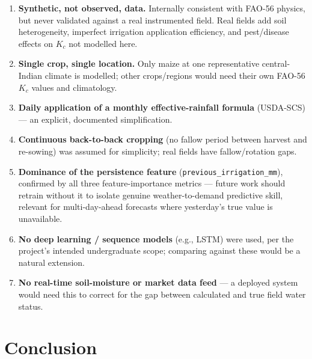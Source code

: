 \documentclass[11pt,a4paper]{article}
\begin{document}
\begin{enumerate}[label=\arabic*.,leftmargin=2em]
    \item \textbf{Synthetic, not observed, data.} Internally consistent with
    FAO-56 physics, but never validated against a real instrumented field.
    Real fields add soil heterogeneity, imperfect irrigation application
    efficiency, and pest/disease effects on $K_c$ not modelled here.
    \item \textbf{Single crop, single location.} Only maize at one
    representative central-Indian climate is modelled; other crops/regions
    would need their own FAO-56 $K_c$ values and climatology.
    \item \textbf{Daily application of a monthly effective-rainfall formula}
    (USDA-SCS) --- an explicit, documented simplification.
    \item \textbf{Continuous back-to-back cropping} (no fallow period between
    harvest and re-sowing) was assumed for simplicity; real fields have
    fallow/rotation gaps.
    \item \textbf{Dominance of the persistence feature}
    (\texttt{previous\_irrigation\_mm}), confirmed by all three
    feature-importance metrics --- future work should retrain without it to
    isolate genuine weather-to-demand predictive skill, relevant for
    multi-day-ahead forecasts where yesterday's true value is unavailable.
    \item \textbf{No deep learning / sequence models} (e.g., LSTM) were used,
    per the project's intended undergraduate scope; comparing against these
    would be a natural extension.
    \item \textbf{No real-time soil-moisture or market data feed} --- a
    deployed system would need this to correct for the gap between
    calculated and true field water status.
\end{enumerate}

\section{Conclusion}
\end{document}
